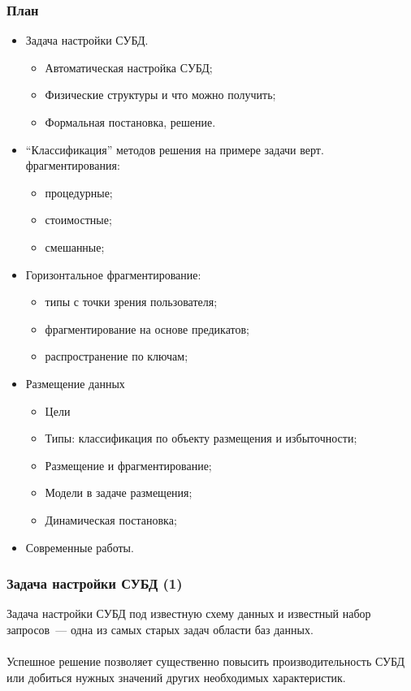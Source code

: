 \documentclass[unicode]{beamer}
\begin{document}
\begin{frame}
\frametitle{План}
{\scriptsize
\begin{itemize}
  \item Задача настройки СУБД.
  \begin{itemize}
    \item Автоматическая настройка СУБД;
    \item Физические структуры и что можно получить;
    \item Формальная постановка, решение.   
  \end{itemize}
  \item ``Классификация'' методов решения на примере задачи верт. фрагментирования:
  \begin{itemize}
    \item процедурные;
    \item стоимостные;
    \item смешанные;
  \end{itemize}  
  \item Горизонтальное фрагментирование:
  \begin{itemize}
    \item типы с точки зрения пользователя;
    \item фрагментирование на основе предикатов;
    \item распространение по ключам;
  \end{itemize} 
  \item Размещение данных
  \begin{itemize}
    \item Цели
    \item Типы: классификация по объекту размещения и избыточности;
    \item Размещение и фрагментирование;
    \item Модели в задаче размещения;
    \item Динамическая постановка;
  \end{itemize} 
  \item Современные работы.
  
\end{itemize}
}
\end{frame}

\begin{frame}
\frametitle{Задача настройки СУБД (1)}
Задача настройки СУБД под известную схему данных и известный набор запросов~--- одна из самых старых задач области баз данных.\\~\\

Успешное решение позволяет существенно повысить производительность СУБД или добиться нужных значений других необходимых характеристик.\\~\\

\end{frame}
\end{document}

